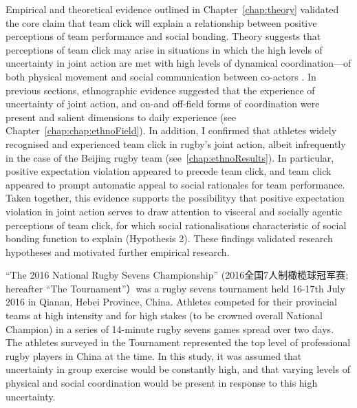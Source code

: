 \begin{CJK}{UTF8}{gbsn}
Empirical and theoretical evidence outlined in Chapter~\ref{chap:theory} validated the core claim that team click will explain a relationship between positive perceptions of team performance and social bonding.  Theory suggests that perceptions of team click may arise in situations in which the high levels of uncertainty in joint action are met with high levels of dynamical coordination---of both physical movement and social communication between co-actors \citep{Semin2008}.  In previous sections,  ethnographic evidence suggested that the experience of uncertainty of joint action, and on-and off-field forms of coordination were present and salient dimensions to daily experience (see Chapter~\ref{chap:chap:ethnoField}).  In addition, I confirmed that athletes widely recognised and experienced team click in rugby’s joint action, albeit infrequently in the case of the Beijing rugby team (see~\ref{chap:ethnoResults}).  In particular, positive expectation violation appeared to precede team click,  and team click appeared to prompt automatic appeal to social rationales for team performance.  Taken together, this evidence supports the possibilityy that positive expectation violation in joint action serves to draw attention to visceral and socially agentic perceptions of team click, for which social rationalisations characteristic of social bonding function to explain (Hypothesis 2).   These findings validated research hypotheses and motivated further empirical research.

``The 2016 National Rugby Sevens Championship'' (2016全国7人制橄榄球冠军赛; hereafter ``The Tournament''）was a rugby sevens tournament held 16-17th July 2016 in Qianan, Hebei Province, China.  Athletes competed for their provincial teams at high intensity and for high stakes (to be crowned overall National Champion) in a series of 14-minute rugby sevens games spread over two days.  The athletes surveyed in the Tournament represented the top level of professional rugby players in China at the time.  In this study, it was assumed that uncertainty in group exercise would be constantly high, and that varying levels of physical and social coordination would be present in response to this high uncertainty.


\end{CJK}
